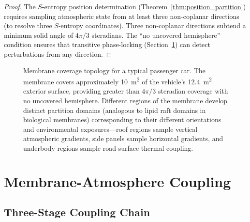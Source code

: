\documentclass[12pt]{article}
\theoremstyle{definition}
\theoremstyle{remark}
\begin{document}
\begin{proof}
The $S$-entropy position determination (Theorem~\ref{thm:position_partition}) requires sampling atmospheric state from at least three non-coplanar directions (to resolve three $S$-entropy coordinates). Three non-coplanar directions subtend a minimum solid angle of $4\pi/3$ steradians. The ``no uncovered hemisphere'' condition ensures that transitive phase-locking (Section~\ref{sec:atmosphere_coupling}) can detect perturbations from any direction.
\end{proof}

\begin{figure}[H]
\centering
{}
\caption{Membrane coverage topology for a typical passenger car. The membrane covers approximately \SI{10}{m^2} of the vehicle's \SI{12.4}{m^2} exterior surface, providing greater than $4\pi/3$ steradian coverage with no uncovered hemisphere. Different regions of the membrane develop distinct partition domains (analogous to lipid raft domains in biological membranes) corresponding to their different orientations and environmental exposures---roof regions sample vertical atmospheric gradients, side panels sample horizontal gradients, and underbody regions sample road-surface thermal coupling.}
\label{fig:vehicle_coverage}
\end{figure}


\section{Membrane-Atmosphere Coupling}
\label{sec:atmosphere_coupling}

\subsection{Three-Stage Coupling Chain}
\end{document}
